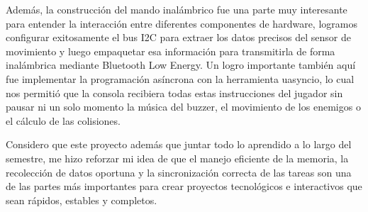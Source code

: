 \documentclass[letterpaper,12pt]{article}
\begin{document}
\begin{itemize}
        Además, la construcción del mando inalámbrico fue una parte muy interesante para entender la interacción entre diferentes componentes de hardware, logramos configurar exitosamente el bus I2C para extraer los datos precisos del sensor de movimiento y luego empaquetar esa información para transmitirla de forma inalámbrica mediante Bluetooth Low Energy. Un logro importante también aquí fue implementar la programación asíncrona con la herramienta uasyncio, lo cual nos permitió que la consola recibiera todas estas instrucciones del jugador sin pausar ni un solo momento la música del buzzer, el movimiento de los enemigos o el cálculo de las colisiones.

        Considero que este proyecto además que juntar todo lo aprendido a lo largo del semestre, me hizo reforzar mi idea de que el manejo eficiente de la memoria, la recolección de datos oportuna y la sincronización correcta de las tareas son una de las partes más importantes para crear proyectos tecnológicos e interactivos que sean rápidos, estables y completos.


    \end{itemize}

    \newpage

    \nocite{*}
    \printbibliography[heading=bibintoc, title={Referencias}]
\end{document}
